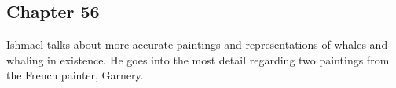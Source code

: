 \subsection{Chapter 56}

Ishmael talks about more accurate paintings and representations of whales and
whaling in existence. He goes into the most detail regarding two paintings from
the French painter, Garnery.

